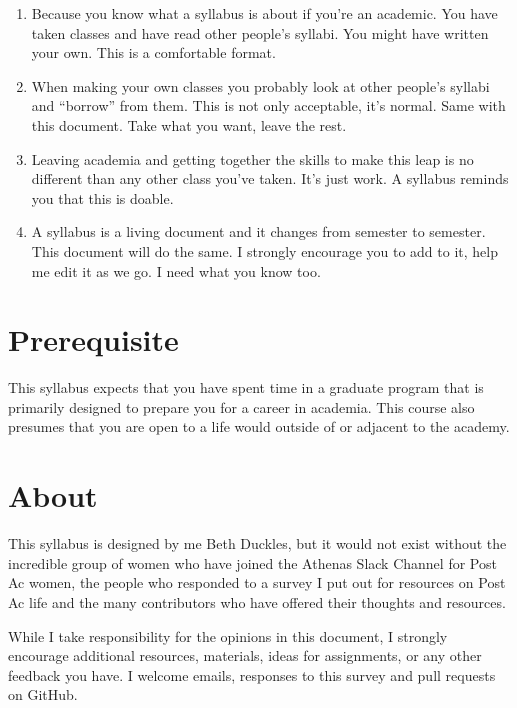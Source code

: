 \documentclass[]{book}
\providecommand{\tightlist}{%
  \setlength{\itemsep}{0pt}\setlength{\parskip}{0pt}}
\begin{document}
\begin{enumerate}
\def\labelenumi{\arabic{enumi})}
\tightlist
\item
  Because you know what a syllabus is about if you're an academic. You
  have taken classes and have read other people's syllabi. You might
  have written your own. This is a comfortable format.\\
\item
  When making your own classes you probably look at other people's
  syllabi and ``borrow'' from them. This is not only acceptable, it's
  normal. Same with this document. Take what you want, leave the rest.
\item
  Leaving academia and getting together the skills to make this leap is
  no different than any other class you've taken. It's just work. A
  syllabus reminds you that this is doable.
\item
  A syllabus is a living document and it changes from semester to
  semester. This document will do the same. I strongly encourage you to
  add to it, help me edit it as we go. I need what you know too.
\end{enumerate}

\section{Prerequisite}\label{prerequisite}

This syllabus expects that you have spent time in a graduate program
that is primarily designed to prepare you for a career in academia. This
course also presumes that you are open to a life would outside of or
adjacent to the academy.

\section{About}\label{about}

This syllabus is designed by me Beth Duckles, but it would not exist
without the incredible group of women who have joined the Athenas Slack
Channel for Post Ac women, the people who responded to a survey I put
out for resources on Post Ac life and the many contributors who have
offered their thoughts and resources.

While I take responsibility for the opinions in this document, I
strongly encourage additional resources, materials, ideas for
assignments, or any other feedback you have. I welcome emails, responses
to this survey and pull requests on GitHub.
\end{document}
